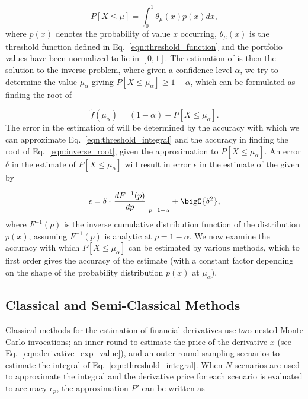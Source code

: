 \begin{enumerate}
\begin{equation}
	\label{eqn:threshold_integral}
	P[X \le \mu] = \int_0^1 \theta_{\mu}(x)p(x)dx,
\end{equation}
where $p(x)$ denotes the probability of value $x$ occurring, $\theta_{\mu}(x)$ is the threshold function defined in Eq.~\eqref{eqn:threshold_function} and the portfolio values have been normalized to lie in $[0,1]$.
The estimation of \var{} is then the solution to the inverse problem, where given a confidence level $\alpha$, we try to determine the value $\mu_{\alpha}$ giving $P[X \le \mu_{\alpha}] \ge 1-\alpha$, which can be formulated as finding the root of

\begin{equation}
	\label{eqn:inverse_root}
	\tilde{f}(\mu_{\alpha}) = (1-\alpha) - P[X \le \mu_{\alpha}].
\end{equation}
The error in the estimation of \var{} will be determined by the accuracy with which we can approximate Eq.~\eqref{eqn:threshold_integral} and the accuracy in finding the root of Eq.~\eqref{eqn:inverse_root}, given the approximation to $P[X \le \mu_{\alpha}]$.
An error $\delta$ in the estimate of $P[X \le \mu_{\alpha}]$ will result in error $\epsilon$ in the estimate of the \var{} given by

\begin{equation}
	\epsilon=\delta \cdot \left. \frac{dF^{-1}(p)}{dp}\right\rvert_{p=1-\alpha} + \bigO{\delta^2},
\end{equation}
where $F^{-1}(p)$ is the inverse cumulative distribution function of the distribution $p(x)$, assuming $F^{-1}(p)$ is analytic at $p = 1 - \alpha$.
We now examine the accuracy with which $P[X \le \mu_{\alpha}]$ can be estimated by various methods, which to first order gives the accuracy of the \var{} estimate (with a constant factor depending on the shape of the probability distribution $p(x)$ at $\mu_{\alpha}$).

\subsection{Classical and Semi-Classical Methods}
Classical methods for the \var{} estimation of financial derivatives use two nested Monte Carlo invocations; an inner round to estimate the price of the derivative $x$ (see Eq.~\eqref{eqn:derivative_exp_value}), and an outer round sampling scenarios to estimate the integral of Eq.~\eqref{eqn:threshold_integral}.
When $N$ scenarios are used to approximate the integral and the derivative price for each scenario is evaluated to accuracy $\epsilon_p$, the approximation $P'$ can be written as


\end{enumerate}

